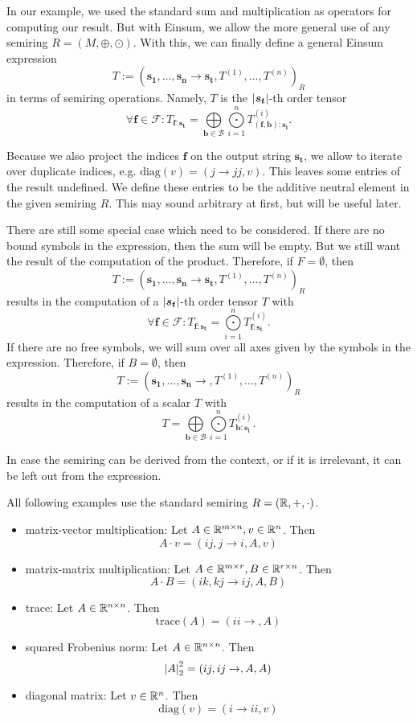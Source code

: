 \begin{definition}
    In our example, we used the standard sum and multiplication as operators for computing our result.
    But with Einsum, we allow the more general use of any semiring $R = (M, \oplus, \odot)$.
    With this, we can finally define a general Einsum expression
    $$T := (\bm{s_1},\dots,\bm{s_n} \rightarrow \bm{s_t}, T^{(1)},\dots,T^{(n)})_R$$
    in terms of semiring operations. Namely, $T$ is the $\left| \bm{s_t} \right|$-th order tensor
    $$\forall \bm{f} \in \mathcal{F}: T_{\bm{f}: \bm{s_t}} = \bigoplus\limits_{\bm{b} \in \mathcal{B}} \bigodot\limits_{i = 1}^{n} T^{(i)}_{(\bm{f},\bm{b}):\bm{s_i}}.$$

    Because we also project the indices $\bm{f}$ on the output string $\bm{s_t}$, we allow to iterate over duplicate indices,
    e.g. $\text{diag}(v) = (j \rightarrow jj, v)$.
    This leaves some entries of the result undefined.
    We define these entries to be the additive neutral element in the given semiring $R$.
    This may sound arbitrary at first, but will be useful later.

    There are still some special case which need to be considered.
    If there are no bound symbols in the expression, then the sum will be empty.
    But we still want the result of the computation of the product.
    Therefore, if $F = \emptyset$, then
    $$T := (\bm{s_1},\dots,\bm{s_n} \rightarrow \bm{s_t}, T^{(1)},\dots,T^{(n)})_R$$
    results in the computation of a $\left| \bm{s_t} \right|$-th order tensor $T$ with
    $$\forall \bm{f} \in \mathcal{F}: T_{\bm{f}: \bm{s_t}} = \bigodot\limits_{i = 1}^{n} T^{(i)}_{\bm{f}:\bm{s_i}}.$$
    If there are no free symbols, we will sum over all axes given by the symbols in the expression.
    Therefore, if $B = \emptyset$, then
    $$T := (\bm{s_1},\dots,\bm{s_n} \rightarrow , T^{(1)},\dots,T^{(n)})_R$$
    results in the computation of a scalar $T$ with
    $$T = \bigoplus\limits_{\bm{b} \in \mathcal{B}} \bigodot\limits_{i = 1}^{n} T^{(i)}_{\bm{b}:\bm{s_i}}.$$

    In case the semiring can be derived from the context, or if it is irrelevant, it can be left out from the expression.
\end{definition}

All following examples use the standard semiring $R = (\mathbb{R}, +, \cdot)$.
\begin{itemize}
    \item matrix-vector multiplication: Let $A \in \mathbb{R}^{m \times n}, v \in \mathbb{R}^{n}$. Then
          $$A \cdot v = (ij, j \rightarrow i, A, v)$$
    \item matrix-matrix multiplication: Let $A \in \mathbb{R}^{m \times r}, B \in \mathbb{R}^{r \times n}$. Then
          $$A \cdot B = (ik, kj \rightarrow ij, A, B)$$
    \item trace: Let $A \in \mathbb{R}^{n \times n}$. Then
          $$\text{trace}(A) = (ii \rightarrow, A)$$
    \item squared Frobenius norm: Let $A \in \mathbb{R}^{n \times n}$. Then
          $$\left| A \right|_2^2 = (ij, ij \rightarrow,A,A)$$
    \item diagonal matrix: Let $v \in \mathbb{R}^{n}$. Then
          $$\text{diag}(v) = (i \rightarrow ii, v)$$
\end{itemize}